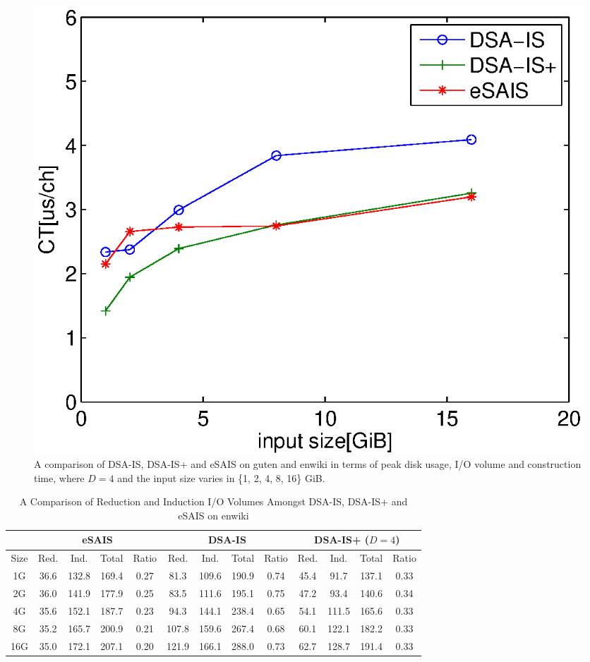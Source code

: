 \documentclass[10pt,journal,compsoc]{IEEEtran}
\begin{document}
{\begin{figure}[t]
{\begin{minipage}[b]{0.45\textwidth}
			\includegraphics[width=1\textwidth]{construction_ct_guten}
		\end{minipage}
	}
	\caption{A comparison of DSA-IS, DSA-IS+ and eSAIS on guten and enwiki in terms of peak disk usage, I/O volume and construction time, where $D = 4$ and the input size varies in \{1, 2, 4, 8, 16\} GiB. }
	\label{fig:construction_performance1}
\end{figure}

\begin{table}%
	\caption{A Comparison of Reduction and Induction I/O Volumes Amongst DSA-IS, DSA-IS+ and eSAIS on enwiki}
	\label{tbl:volume_cmp}
	\centering
	\begin{tabular}{|c|c|c|c|c|c|c|c|c|c|c|c|c|}
		\hline
		\multicolumn{1}{|c}{} & \multicolumn{4}{|c|}{eSAIS} & \multicolumn{4}{c|}{DSA-IS} & \multicolumn{4}{c|}{DSA-IS+ ($D = 4$)}\\\hline
		\hline
		Size & Red. & Ind. & Total & Ratio & Red. & Ind. & Total & Ratio & Red. & Ind. & Total & Ratio\\\hline
		1G & 36.6 & 132.8 & 169.4 & 0.27 & 81.3 & 109.6 & 190.9 & 0.74 & 45.4 & 91.7 & 137.1 & 0.33\\\hline
		2G & 36.0 & 141.9 & 177.9 & 0.25 & 83.5 & 111.6 & 195.1 & 0.75 & 47.2 & 93.4 & 140.6 & 0.34\\\hline
		4G & 35.6 & 152.1 & 187.7 & 0.23 & 94.3 & 144.1 & 238.4 & 0.65 & 54.1 & 111.5  & 165.6 & 0.33\\\hline
		8G & 35.2 & 165.7 & 200.9 & 0.21 & 107.8 & 159.6 & 267.4 & 0.68 & 60.1 & 122.1 & 182.2 & 0.33\\\hline
		16G & 35.0 & 172.1 & 207.1 & 0.20 & 121.9 & 166.1 & 288.0 & 0.73 & 62.7 & 128.7 & 191.4 & 0.33\\\hline
	\end{tabular}
\end{table}%

}
\end{document}

